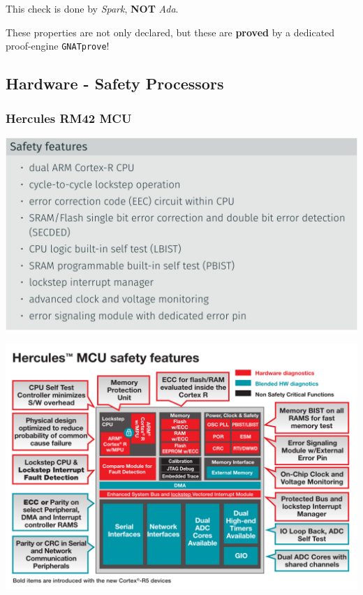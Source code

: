 \documentclass[
  10pt,
  a4paper,
]{article}
\begin{document}
\begin{multicols*}{2}
\begin{tcolorbox}
This check is done by \emph{Spark}, \textbf{NOT} \emph{Ada}.

These properties are not only declared, but these are \textbf{proved} by
a dedicated proof-engine \texttt{GNATprove}!

\end{tcolorbox}

\subsection{Hardware - Safety
Processors}\label{hardware---safety-processors}

\subsubsection{Hercules RM42 MCU}\label{hercules-rm42-mcu}

\includegraphics{images/safety/image-21.png}

\includegraphics{images/safety/image-20.png}


\end{multicols*}
\end{document}
